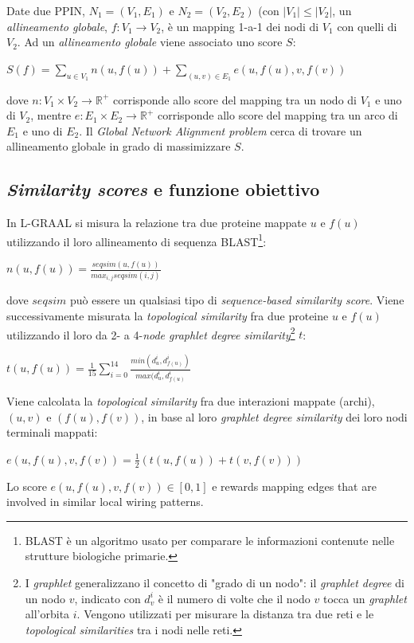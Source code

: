 \documentclass[11pt]{article}
\begin{document}
Date due PPIN, $N_1 = (V_1, E_1)$ e $N_2 = (V_2, E_2)$ (con $|V_1| \leq |V_2|$, un \textit{allineamento globale}, $f: V_1 \rightarrow V_2$, è un mapping 1-a-1 dei nodi di $V_1$ con quelli di $V_2$. Ad un \textit{allineamento globale} viene associato uno score $S$:
\begin{center}
$S(f) = \displaystyle{\sum_{u \in V_1}n(u,f(u))} + \displaystyle{\sum_{(u,v) \in E_1}e(u,f(u),v,f(v))}$
\end{center}
dove $n : V_1 \times V_2 \rightarrow \mathbb{R}^+$ corrisponde allo score del mapping tra un nodo di $V_1$ e uno di $V_2$, mentre $e : E_1 \times E_2 \rightarrow \mathbb{R}^+$ corrisponde allo score del mapping tra un arco di $E_1$ e uno di $E_2$. Il \textit{Global Network Alignment problem} cerca di trovare un allineamento globale in grado di massimizzare $S$.

\subsection{\textit{Similarity scores} e funzione obiettivo}
In L-GRAAL si misura la relazione tra due proteine mappate $u$ e $f(u)$ utilizzando il loro allineamento di sequenza BLAST\footnote{BLAST è un algoritmo usato per comparare le informazioni contenute nelle strutture biologiche primarie.}:
\begin{center}
$n(u,f(u)) = \displaystyle{\frac{seqsim(u,f(u))}{max_{i,j}seqsim(i,j)}}$
\end{center}
dove $seqsim$ può essere un qualsiasi tipo di \textit{sequence-based similarity score}. Viene successivamente misurata la \textit{topological similarity} fra due proteine $u$ e $f(u)$ utilizzando il loro da 2- a 4-\textit{node graphlet degree similarity}\footnote{I \textit{graphlet} generalizzano il concetto di "grado di un nodo": il \textit{graphlet degree} di un nodo $v$, indicato con $d^i_v$ è il numero di volte che il nodo $v$ tocca un \textit{graphlet} all'orbita $i$. Vengono utilizzati per misurare la distanza tra due reti e le \textit{topological similarities} tra i nodi nelle reti.} $t$:
\begin{center}
$t(u,f(u)) = \frac{1}{15}\displaystyle{\sum \limits_{i=0}^{14}\frac{min(d_u^i,d_{f(u)}^i)}{max(d_u^i,d_{f(u)}^i}}$
\end{center}
Viene calcolata la \textit{topological similarity} fra due interazioni mappate (archi), $(u,v)$ e $(f(u),f(v))$, in base al loro \textit{graphlet degree similarity} dei loro nodi terminali mappati:

\begin{center}
$e(u,f(u),v,f(v)) = \displaystyle{\frac{1}{2}(t(u,f(u))+t(v,f(v)))}$
\end{center}
Lo score $e(u,f(u),v,f(v)) \in [0,1]$ e rewards mapping edges that are involved in similar local wiring patterns.
\end{document}

